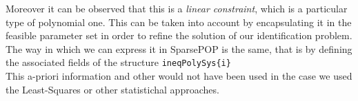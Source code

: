 Moreover it can be observed that this is a \textit{linear constraint}, which is a particular type of polynomial one. This can be taken into account by encapsulating it in the feasible parameter set in order to refine the solution of our identification problem. The way in which we can express it in SparsePOP is the same, that is by defining the associated fields of the structure \texttt{ineqPolySys\{i\}}\\
This a-priori information and other would not have been used in the case we used the Least-Squares or other statistichal approaches.



 








